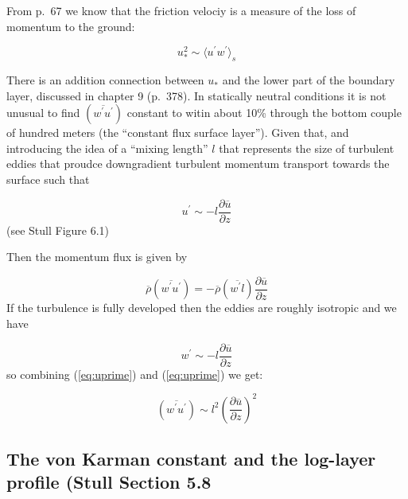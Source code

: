 \documentclass[12pt]{article}
\begin{document}
From p.~67 we know that the friction velociy is a measure of the loss of momentum to the
ground:

\begin{equation}
  \label{eq:friction}
  u_*^2 \sim \langle u^\prime w^\prime \rangle_s
\end{equation}

There is an addition connection between $u_*$ and the lower part of the boundary layer, discussed
in chapter 9 (p.~378).  In statically neutral conditions it is not unusual to find
$\left (\overline{ w^\prime u^\prime } \right )$ constant to witin about 10\% through the
bottom couple of hundred meters (the ``constant flux surface layer'').  Given that, and introducing
the idea of a ``mixing length'' $l$ that represents the size of turbulent eddies that proudce
downgradient turbulent momentum transport towards the surface such that

\begin{equation}
  \label{eq:uprime}
  u^\prime  \sim - l \frac{\partial  \overline{ u}}{\partial z} 
\end{equation}
(see Stull Figure 6.1)

Then the momentum flux is given by 

\begin{equation}
  \label{eq:momflux}
  \overline{ \rho} \left (\overline{ w^\prime u^\prime } \right ) = - \overline{ \rho}
\left (   \overline{ w^\prime l }  \right ) \frac{\partial  \overline{ u}}{\partial z} 
\end{equation}
If the turbulence is fully developed then the eddies are roughly isotropic and we have

\begin{equation}
  \label{eq:wprime}
  w^\prime  \sim - l \frac{\partial  \overline{ u}}{\partial z} 
\end{equation}
so combining (\ref{eq:uprime}) and (\ref{eq:uprime}) we get:

\begin{equation}
  \label{eq:prandtl}
  \left (\overline{ w^\prime u^\prime } \right ) \sim l^2 \left ( \frac{\partial  \overline{ u}}{\partial z}   \right )^2
\end{equation}




 
\subsection{The von Karman constant and the log-layer profile (Stull Section 5.8}
\label{sec:von-karman-constant}
\end{document}

